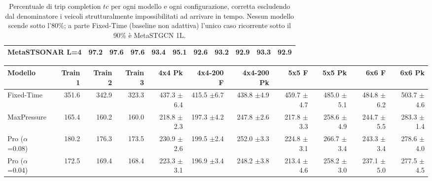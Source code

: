 \begin{table}
\begin{tabular}{@{}lrrrrrrrrrr@{}}
    MetaSTSONAR L=4           & 97.2    & 97.6    & 97.6    & 93.4   & 95.1      & 92.6       & 93.2  & 92.9   & 93.3  & 92.9   \\
    \bottomrule
  \end{tabular}
  \caption{Percentuale di trip completion $tc$ per ogni modello
    e ogni configurazione, corretta escludendo dal
    denominatore i veicoli strutturalmente impossibilitati ad arrivare in
    tempo. Nessun modello scende sotto l'80\%; a parte Fixed-Time (baseline non
    adattiva) l'unico caso ricorrente sotto il 90\% è MetaSTGCN 1L.}
  \label{tab:tc-adjusted}
\end{table}

\begin{table}
  \centering
  \tiny
  \begin{tabular}{@{}lrrrrrrrrrr@{}}
    \toprule
    Modello                   & Train 1 & Train 2 & Train 3 & 4x4 Pk                                     & 4x4-200 F                                  & 4x4-200 Pk                                 & 5x5 F                                       & 5x5 Pk                                     & 6x6 F                                      & 6x6 Pk                                     \\
    \midrule
    Fixed-Time                & 351.6   & 342.9   & 323.3   & 437.3 {\fontsize{4}{4}\selectfont$\pm$6.4} & 415.5 {\fontsize{4}{4}\selectfont$\pm$6.7} & 438.8 {\fontsize{4}{4}\selectfont$\pm$4.9} & 459.7 {\fontsize{4}{4}\selectfont$\pm$4.7}  & 485.0 {\fontsize{4}{4}\selectfont$\pm$5.1} & 484.8 {\fontsize{4}{4}\selectfont$\pm$6.2} & 503.7 {\fontsize{4}{4}\selectfont$\pm$4.6} \\
    MaxPressure               & 165.4   & 160.2   & 160.0   & 218.8 {\fontsize{4}{4}\selectfont$\pm$2.3} & 197.3 {\fontsize{4}{4}\selectfont$\pm$4.2} & 247.8 {\fontsize{4}{4}\selectfont$\pm$2.6} & 217.8 {\fontsize{4}{4}\selectfont$\pm$3.3}  & 258.6 {\fontsize{4}{4}\selectfont$\pm$4.9} & 244.7 {\fontsize{4}{4}\selectfont$\pm$5.5} & 283.3 {\fontsize{4}{4}\selectfont$\pm$1.4} \\
    Pro ($\alpha$=0.08)       & 180.2   & 176.3   & 173.5   & 230.9 {\fontsize{4}{4}\selectfont$\pm$2.6} & 199.5 {\fontsize{4}{4}\selectfont$\pm$2.4} & 252.0 {\fontsize{4}{4}\selectfont$\pm$3.3} & 224.8 {\fontsize{4}{4}\selectfont$\pm$3.1}  & 266.7 {\fontsize{4}{4}\selectfont$\pm$3.4} & 243.3 {\fontsize{4}{4}\selectfont$\pm$3.4} & 278.6 {\fontsize{4}{4}\selectfont$\pm$4.0} \\
    Pro ($\alpha$=0.04)       & 172.5   & 169.4   & 168.4   & 223.3 {\fontsize{4}{4}\selectfont$\pm$3.1} & 196.9 {\fontsize{4}{4}\selectfont$\pm$3.4} & 248.2 {\fontsize{4}{4}\selectfont$\pm$3.8} & 213.4 {\fontsize{4}{4}\selectfont$\pm$4.6}  & 258.2 {\fontsize{4}{4}\selectfont$\pm$3.0} & 237.1 {\fontsize{4}{4}\selectfont$\pm$5.0} & 277.5 {\fontsize{4}{4}\selectfont$\pm$4.5} \\

\end{tabular}
\end{table}
